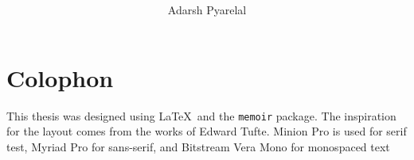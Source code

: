 \documentclass[final,twoside,10pt]{memoir}
\title{\scshape\color{Maroon}{\MakeTextLowercase{Searches for New Physics at Colliders}}}
\author{Adarsh Pyarelal}
\date{}
\theoremstyle{definition}
\begin{document}




\cleardoublepage
\tableofcontents*
\cleardoublepage
\listoffigures*
\cleardoublepage
\listoftables*
\cleardoublepage





\appendix
\appendixpage


\printbibliography
\newpage
\pagestyle{empty}
\hfill
\vfill
\section*{Colophon}
This thesis was designed using \LaTeX\ and the \texttt{memoir} package. The inspiration for the layout comes from the works of Edward Tufte. Minion Pro is used for serif test, Myriad Pro for sans-serif, and Bitstream Vera Mono for monospaced text
\bigskip
\end{document}
